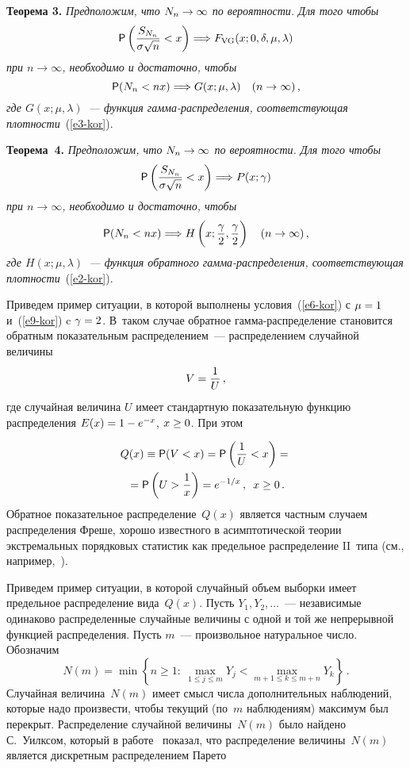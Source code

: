 \begin{multicols}{2}
\smallskip

\noindent
\textbf{Теорема 3.} \textit{Предположим, что $N_n\hm\to\infty$ по
вероятности. Для того чтобы}
$$
{\sf P}\left(\displaystyle\frac{\displaystyle S_{N_n}\mathstrut}{\displaystyle \sigma\sqrt{n}\mathstrut}<x\right)\Longrightarrow
F_{\mathrm{VG}}(x;0,\delta,\mu,\lambda)
$$
\textit{при $n\to\infty$, необходимо и достаточно, чтобы}
$$
{\sf P}(N_n<nx)\Longrightarrow G(x;\mu,\lambda)\quad  (n\to\infty)\,,
$$
\textit{где $G(x;\mu,\lambda)$~--- функция гам\-ма-рас\-пре\-де\-ле\-ния,
соответствующая плотности}~(\ref{e3-kor}). 

\smallskip

\noindent
\textbf{Теорема~4.} \textit{Предположим, что $N_n\hm\to\infty$ по
вероятности. Для того чтобы}
$$
{\sf P}\left(\displaystyle\frac{\displaystyle S_{N_n}\mathstrut}{\displaystyle \sigma\sqrt{n}\mathstrut}<x\right)\Longrightarrow
P(x;\gamma)
$$
\textit{при $n\to\infty$, необходимо и достаточно, чтобы}
\begin{equation}
{\sf P}(N_n<nx)\Longrightarrow H\left(x;\displaystyle\frac{\displaystyle \gamma\mathstrut}{\displaystyle 2\mathstrut},\displaystyle\frac{\displaystyle \gamma\mathstrut}{\displaystyle 2\mathstrut}\right)\quad
(n\to\infty)\,,\label{e9-kor}
\end{equation}
\textit{где $H(x;\mu,\lambda)$~--- функция обратного гамма-рас\-пре\-де\-ле\-ния,
соответствующая плотности}~(\ref{e2-kor}). 

\smallskip

Приведем пример ситуации, в которой выполнены условия~(\ref{e6-kor}) с
$\mu\hm=1$ и~(\ref{e9-kor}) c $\gamma\hm=2$. В~таком случае обратное
гамма-распределение становится обратным показательным
распределением~--- распределением случайной величины
$$
V=\displaystyle\frac{\displaystyle 1\mathstrut}{\displaystyle U\mathstrut}\,,
$$
где случайная величина $U$ имеет стандартную показательную функцию
распределения $E(x)\hm=1\hm-e^{-x}$, $x\hm\ge0$. При этом

\noindent
\begin{multline*}
Q(x)\equiv {\sf P}(V<x)={\sf P}\left(\displaystyle\frac{\displaystyle 1\mathstrut}{\displaystyle U\mathstrut}<x\right)={}\\
{}={\sf
P}\left(U>\displaystyle\frac{\displaystyle 1\mathstrut}{\displaystyle x\mathstrut}\right)=e^{-1/x}\,,\enskip x\ge0\,.
\end{multline*}
Обратное показательное распределение~$Q(x)$ является частным
случаем распределения Фреше, хорошо известного в асимптотической
теории экстремальных порядковых статистик как предельное
распределение II~типа (см., например,~\cite{Gumbel1965}).

Приведем пример ситуации, в которой случайный объем выборки имеет
предельное распределение вида~$Q(x)$. Пусть $Y_1,Y_2,\ldots$~---
независимые одинаково распределенные случайные величины с одной и
той же непрерывной функцией распределения. Пусть $m$~---
произвольное натуральное число. Обозначим
$$
N(m)=\min\left\{n\ge1:\ \max\limits_{1\le j\le m}Y_j<\max\limits_{m+1\le k\le
m+n}Y_k\right\}\,.
$$
Случайная величина~$N(m)$ имеет смысл чис\-ла дополнительных
наблюдений, которые надо произвести, чтобы текущий (по~$m$
наблюдениям) максимум был перекрыт. Распределение случайной
величины~$N(m)$ было найдено С.~Уилксом, который в работе~\cite{Wilks1959} 
показал, что распределение величины~$N(m)$
является дискретным распределением Парето


\end{multicols}
